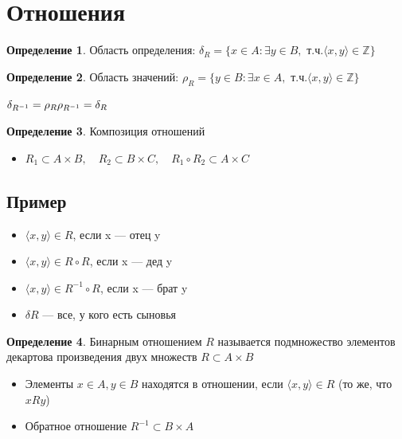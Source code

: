 \documentclass[12pt,letterpaper]{report}
\theoremstyle{definition}
\newtheorem*{conj}{Определение}
\begin{document}
\section{Отношения}
\begin{conj} 
    Область определения: 
    $\delta_{R} = \{x \in A: \exists y \in B, $ т.ч.$ \langle x, y \rangle  \in \mathbb{Z} \} $ 
\end{conj}

\begin{conj} 
    Область значений: 
    $\rho_{R} = \{y \in B: \exists x \in A, $ т.ч.$ \langle x, y \rangle  \in \mathbb{Z} \} $ 
\end{conj}
$\delta_{R^{-1}} = \rho_{R} \\
\rho_{R^{-1}} = \delta_{R}$

\begin{conj} 
    Композиция отношений 
\end{conj}

\begin{itemize}
    \item[] $R_1 \subset A \times B, \quad R_2 \subset B \times C, \quad R_1 \circ R_2 \subset A \times C$
\end{itemize}
\subsection*{Пример}
\begin{itemize}
    \item $\langle x, y \rangle \in R$, если x — отец y
    \item $\langle x, y \rangle \in R \circ R$, если x — дед y
    \item $\langle x, y \rangle \in R^{-1} \circ R$, если x — брат y
    \item $\delta R$ — все, у кого есть сыновья
\end{itemize}
\begin{conj} 
    Бинарным отношением $R$ называется подмножество элементов декартова произведения двух
    множеств $R \subset A \times B$
\end{conj}

\begin{itemize}
    \item[] Элементы $x \in A, y \in B$ находятся в отношении, если $  \langle x, y \rangle \in R $ (то же, что $xRy$)
    \item[] Обратное отношение $R^{-1} \subset B \times A$ 
\end{itemize}
\end{document}

